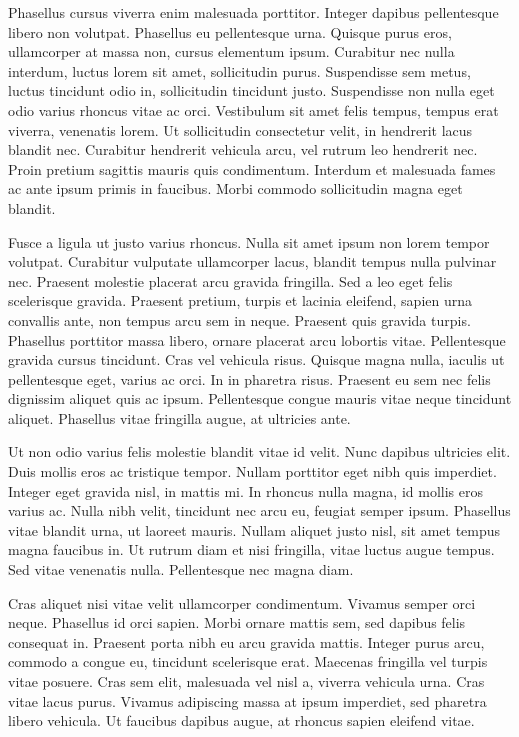 \documentclass[2pt,a4paper,twoside ]{article}
\begin{document}
\begin{multicols}{2}
Phasellus cursus viverra enim malesuada porttitor. Integer dapibus pellentesque libero non volutpat. Phasellus eu pellentesque urna. Quisque purus eros, ullamcorper at massa non, cursus elementum ipsum. Curabitur nec nulla interdum, luctus lorem sit amet, sollicitudin purus. Suspendisse sem metus, luctus tincidunt odio in, sollicitudin tincidunt justo. Suspendisse non nulla eget odio varius rhoncus vitae ac orci. Vestibulum sit amet felis tempus, tempus erat viverra, venenatis lorem. Ut sollicitudin consectetur velit, in hendrerit lacus blandit nec. Curabitur hendrerit vehicula arcu, vel rutrum leo hendrerit nec. Proin pretium sagittis mauris quis condimentum. Interdum et malesuada fames ac ante ipsum primis in faucibus. Morbi commodo sollicitudin magna eget blandit.

Fusce a ligula ut justo varius rhoncus. Nulla sit amet ipsum non lorem tempor volutpat. Curabitur vulputate ullamcorper lacus, blandit tempus nulla pulvinar nec. Praesent molestie placerat arcu gravida fringilla. Sed a leo eget felis scelerisque gravida. Praesent pretium, turpis et lacinia eleifend, sapien urna convallis ante, non tempus arcu sem in neque. Praesent quis gravida turpis. Phasellus porttitor massa libero, ornare placerat arcu lobortis vitae. Pellentesque gravida cursus tincidunt. Cras vel vehicula risus. Quisque magna nulla, iaculis ut pellentesque eget, varius ac orci. In in pharetra risus. Praesent eu sem nec felis dignissim aliquet quis ac ipsum. Pellentesque congue mauris vitae neque tincidunt aliquet. Phasellus vitae fringilla augue, at ultricies ante.

Ut non odio varius felis molestie blandit vitae id velit. Nunc dapibus ultricies elit. Duis mollis eros ac tristique tempor. Nullam porttitor eget nibh quis imperdiet. Integer eget gravida nisl, in mattis mi. In rhoncus nulla magna, id mollis eros varius ac. Nulla nibh velit, tincidunt nec arcu eu, feugiat semper ipsum. Phasellus vitae blandit urna, ut laoreet mauris. Nullam aliquet justo nisl, sit amet tempus magna faucibus in. Ut rutrum diam et nisi fringilla, vitae luctus augue tempus. Sed vitae venenatis nulla. Pellentesque nec magna diam.

Cras aliquet nisi vitae velit ullamcorper condimentum. Vivamus semper orci neque. Phasellus id orci sapien. Morbi ornare mattis sem, sed dapibus felis consequat in. Praesent porta nibh eu arcu gravida mattis. Integer purus arcu, commodo a congue eu, tincidunt scelerisque erat. Maecenas fringilla vel turpis vitae posuere. Cras sem elit, malesuada vel nisl a, viverra vehicula urna. Cras vitae lacus purus. Vivamus adipiscing massa at ipsum imperdiet, sed pharetra libero vehicula. Ut faucibus dapibus augue, at rhoncus sapien eleifend vitae.


\end{multicols}
\end{document}
